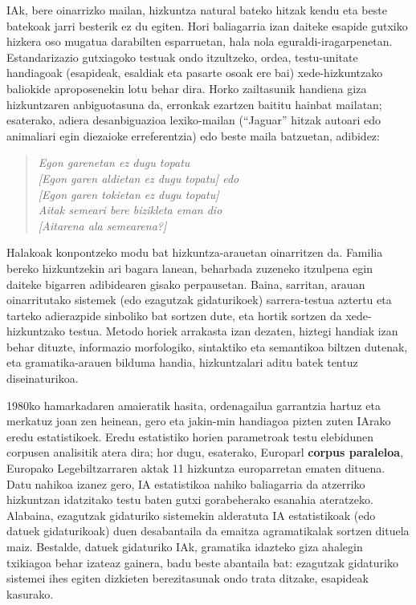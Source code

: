\begin{multicols}{2}
IAk, bere oinarrizko mailan, hizkuntza natural bateko hitzak kendu eta beste batekoak jarri besterik ez du egiten. Hori baliagarria izan daiteke esapide gutxiko hizkera oso mugatua darabilten esparruetan, hala nola eguraldi-iragarpenetan. Estandarizazio gutxiagoko testuak ondo itzultzeko, ordea, testu-unitate handiagoak (esapideak, esaldiak eta pasarte osoak ere bai) xede-hizkuntzako baliokide aproposenekin lotu behar dira. Horko zailtasunik handiena giza hizkuntzaren anbiguotasuna da, erronkak ezartzen baititu hainbat mailatan; esaterako, adiera desanbiguazioa lexiko-mailan (“Jaguar” hitzak autoari edo animaliari egin diezaioke erreferentzia) edo beste maila batzuetan, adibidez:

\begin{quote}
\textit{Egon garenetan ez dugu topatu}\\
\textit{[Egon garen aldietan ez dugu topatu] edo} \\
\textit{[Egon garen tokietan ez dugu topatu]}\\
\textit{Aitak semeari bere bizikleta eman dio}\\
\textit{[Aitarena ala semearena?]}
\end{quote}

Halakoak konpontzeko modu bat hizkuntza-arauetan oinarritzen da. Familia bereko hizkuntzekin ari bagara lanean, beharbada zuzeneko itzulpena egin daiteke bigarren adibidearen gisako perpausetan. Baina, sarritan, arauan oinarritutako sistemek (edo ezagutzak gidaturikoek) sarrera-testua aztertu eta tarteko adierazpide sinboliko bat sortzen dute, eta hortik sortzen da xede-hizkuntzako testua. Metodo horiek arrakasta izan dezaten, hiztegi handiak izan behar dituzte, informazio morfologiko, sintaktiko eta semantikoa biltzen dutenak, eta gramatika-arauen bilduma handia, hizkuntzalari aditu batek tentuz diseinaturikoa.

1980ko hamarkadaren amaieratik hasita, ordenagailua garrantzia hartuz eta merkatuz joan zen heinean, gero eta jakin-min handiagoa pizten zuten IArako eredu estatistikoek. Eredu estatistiko horien parametroak testu elebidunen corpusen analisitik atera dira; hor dugu, esaterako, Europarl \textbf{corpus paraleloa}, Europako Legebiltzarraren aktak 11 hizkuntza europarretan ematen dituena. Datu nahikoa izanez gero, IA estatistikoa nahiko baliagarria da atzerriko hizkuntzan idatzitako testu baten gutxi gorabeherako esanahia ateratzeko. Alabaina, ezagutzak gidaturiko sistemekin alderatuta IA estatistikoak (edo datuek gidaturikoak) duen desabantaila da emaitza agramatikalak sortzen dituela maiz. Bestalde, datuek gidaturiko IAk, gramatika idazteko giza ahalegin txikiagoa behar izateaz gainera, badu beste abantaila bat: ezagutzak gidaturiko sistemei ihes egiten dizkieten berezitasunak ondo trata ditzake, esapideak kasurako. 


\end{multicols}
